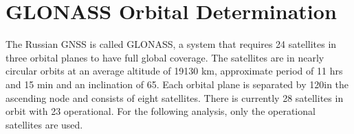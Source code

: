 \documentclass[Space3_Assign2]{subfile}
\begin{document}
\section{GLONASS Orbital Determination}

The Russian GNSS is called GLONASS, a system that requires 24 satellites in three orbital planes to have full global coverage. The satellites are in nearly circular orbits at an average altitude of 19130 km, approximate period of 11 hrs and 15 min and an inclination of 65\Deg. Each orbital plane is separated by 120\Deg in the ascending node and consists of eight satellites. There is currently 28 satellites in orbit with 23 operational. For the following analysis, only the operational satellites are used.


\end{document}
